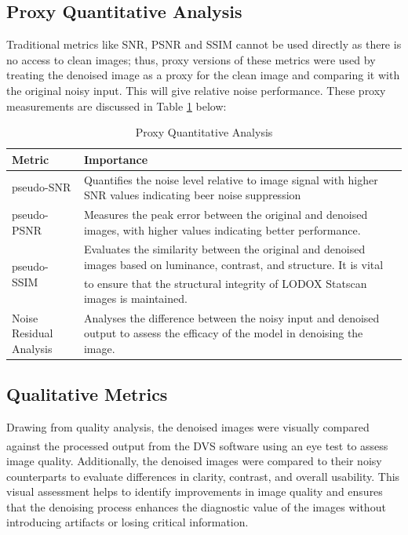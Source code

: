 \subsection{Proxy Quantitative Analysis}
Traditional metrics like \gls{SNR}, \gls{PSNR} and \gls{SSIM} cannot be used directly as there is no access to clean images; thus, proxy versions of these metrics were used by treating the denoised image as a proxy for the clean image and comparing it with the original noisy input. This will give relative noise performance. These proxy measurements are discussed in Table \ref{tab:metrics} below:

\begin{table}[h!]
	\centering
	\caption{Proxy Quantitative Analysis}
	\label{tab:metrics}
	\begin{tabular}{@{}lp{10cm}@{}}
		\toprule
		\textbf{Metric}         & \textbf{Importance}                                                                                                              \\ \midrule
		pseudo-\gls{SNR}              & Quantifies the noise level relative to image signal with higher \gls{SNR} values indicating beer noise suppression                     \\
		pseudo-\gls{PSNR}             & Measures the peak error between the original and denoised images, with higher values indicating better performance.              \\
		pseudo-\gls{SSIM} &
		Evaluates the similarity between the original and denoised images based on luminance, contrast, and structure. It is vital to ensure that the structural integrity of  LODOX\textsuperscript{\textregistered} Statscan\textsuperscript{\textregistered} images is maintained. \\
		Noise Residual Analysis & Analyses the difference between the noisy input and denoised output to assess the efficacy of the model in denoising the image. \\ \bottomrule
	\end{tabular}
\end{table}

\subsection{Qualitative Metrics}
Drawing from \cite{juneja_denoising_2024} quality analysis, the denoised images were visually compared against the processed output from the DVS\textsuperscript{\textregistered} software using an eye test to assess image quality. Additionally, the denoised images were compared to their noisy counterparts to evaluate differences in clarity, contrast, and overall usability. This visual assessment helps to identify improvements in image quality and ensures that the denoising process enhances the diagnostic value of the images without introducing artifacts or losing critical information.


